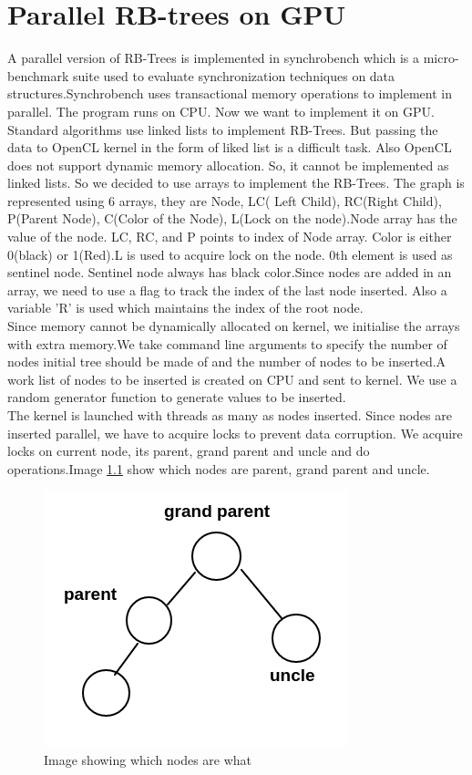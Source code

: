 \documentclass[BTech]{iitmdiss}
\begin{document}
\chapter{Parallel RB-trees on GPU}
A parallel version of RB-Trees is implemented in synchrobench which is a micro-benchmark suite used to evaluate synchronization techniques on data structures.Synchrobench uses transactional memory operations to implement in parallel. The program runs on CPU. Now we want to implement it on GPU. Standard algorithms use linked lists to implement RB-Trees. But passing the data to OpenCL kernel in the form of liked list is a difficult task. Also OpenCL does not support dynamic memory allocation. So, it cannot be implemented as linked lists. So we decided to use arrays to implement the RB-Trees. The graph is represented using 6 arrays, they are Node, LC( Left Child), RC(Right Child), P(Parent Node), C(Color of the Node), L(Lock on the node).Node array has the value of the node. LC, RC, and P points to index of Node array. Color is either 0(black) or 1(Red).L is used to acquire lock on the node. 0th element is used as sentinel node. Sentinel node always has black color.Since nodes are added in an array, we need to use a flag to track the index of the last node inserted. Also a variable 'R' is used which maintains the index of the root node.\\
Since memory cannot be dynamically allocated on kernel, we initialise the arrays with extra memory.We take command line arguments to specify the number of nodes initial tree should be made of and the number of nodes to be inserted.A work list of nodes to be inserted is created on CPU and sent to kernel. We use a random generator function to generate values to be inserted.\\
The kernel is launched with threads as many as nodes inserted. Since nodes are inserted parallel, we have to acquire locks to prevent data corruption. We acquire locks on current node, its parent, grand parent and uncle and do operations.Image \ref{fig:node_labels} show which nodes are parent, grand parent and uncle.
\begin{figure}[h]
    \centering
    \includegraphics{img1.png}
    \caption{Image showing which nodes are what}
    \label{fig:node_labels}
\end{figure}\\
\end{document}
